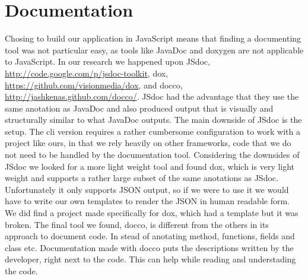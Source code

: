 \section{Documentation} %
\label{sec:Documentation}
Chosing to build our application in JavaScript means that finding a documenting tool was not particular easy, as tools like JavaDoc and doxygen are not applicable to JavaScript. In our research we happened upon JSdoc, \url{http://code.google.com/p/jsdoc-toolkit}, dox, \url{https://github.com/visionmedia/dox}, and docco, \url{http://jashkenas.github.com/docco/}. JSdoc had the advantage that they use the same anotation as JavaDoc and also produced output that is visually and structurally similar to what JavaDoc outputs. The main downside of JSdoc is the setup. The cli version requires a rather cumbersome configuration to work with a project like ours, in that we rely heavily on other frameworks, code that we do not need to be handled by the documentation tool. Considering the downsides of JSdoc we looked for a more light weight tool and found dox, which is very light weight and supports a rather large subset of the same anotations as JSdoc. Unfortunately it only supports JSON output, so if we were to use it we would have to write our own templates to render the JSON in human readable form. We did find a project made specifically for dox, which had a template but it was broken. The final tool we found, docco, is different from the others in its approach to document code. In stead of anotating method, functions, fields and class etc. Documentation made with docco puts the descriptions written by the developer, right next to the code. This can help while reading and understading the code. 
